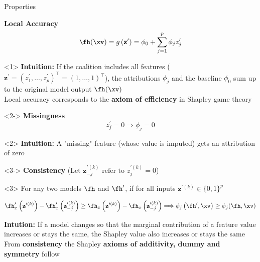 \documentclass[11pt,compress,t,notes=noshow, aspectratio=169, xcolor=table]{beamer}
\begin{document}
\begin{frame}{Properties}

\textbf{Local Accuracy}
$$
\fh(\xv)=g\left(\mathbf{z}^{\prime}\right)=\phi_{0}+\sum_{j=1}^{p} \phi_{j} z_{j}^{\prime}
$$

\begin{onlyenv}<1>
\textbf{Intuition:} If the coalition includes all features ($\mathbf{z}^{\prime} = (z^{\prime}_1, \dots, z^{\prime}_p)^\top = (1, \dots, 1)^\top $), the attributions $\phi_j$ and the baseline $\phi_0$ sum up to the original model output $\fh(\xv)$\\\medskip
Local accuracy corresponds to the \textbf{axiom of efficiency} in Shapley game theory

\end{onlyenv}

\begin{onlyenv}<2->
\textbf{Missingness}
$$
z_{j}^{\prime}=0 \Longrightarrow \phi_{j}=0
$$
\end{onlyenv}

\begin{onlyenv}<2>
\textbf{Intuition:}  A "missing" feature (whose value is imputed) gets an attribution of zero
\end{onlyenv}

\begin{onlyenv}<3->
\textbf{Consistency} (Let $\mathbf{z}^{\prime (k)}_{-j} \text{ refer to } z_{j}^{\prime (k)}=0$) \\
\end{onlyenv}

\begin{onlyenv}<3>
For any two models $\fh$ and $\fh^{\prime}$, if for all inputs $\mathbf{z}^{\prime (k)} \in \{0, 1\}^p$

$$
\fh_{x}^{\prime}\left(\mathbf{z}^{\prime (k)}\right)-\fh_{x}^{\prime}\left(\mathbf{z}^{\prime (k)}_{-j}\right) \geq \fh_{x}\left(\mathbf{z}^{\prime (k)}\right)-\fh_{x}\left(\mathbf{z}^{\prime (k)} _{-j}\right) \Longrightarrow \phi_{j}\left(\fh^{\prime}, \xv\right) \geq \phi_{j}(\fh, \xv)
$$

\textbf{Intution:} If a model changes so that the marginal contribution of a feature value increases or stays the same, the Shapley value also increases or stays the same\\\medskip
From \textbf{consistency} the Shapley \textbf{axioms of additivity, dummy and symmetry} follow
\end{onlyenv}


\end{frame}

\endlecture
\end{document}
